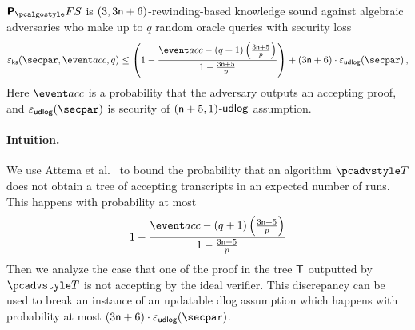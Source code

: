 \begin{lemma}
	\label{lem:plonkprot_ss}
	$\plonkprotfs$ is $(3, 3 \mathsf{n} + 6)$-rewinding-based knowledge sound against algebraic adversaries who make up to $q$ random oracle queries with security loss 
	\[
	\epscss(\secpar,\accProb, q) \leq \left(1 - \frac{\accProb - (q + 1) \left(\frac{3 \noofc + 5}{p} \right)}{1 - \frac{3 \noofc + 5}{p}}\right) + (3 \noofc + 6) \cdot \epsudlog (\secpar) %
	\,,
	\]
	Here $\accProb$ is a probability that the adversary outputs an accepting proof, 
	and $\epsudlog(\secpar)$ is security of $(\mathsf{n} + 5, 1)$-$\mathsf{udlog}$ 
	assumption.
\end{lemma}

\paragraph{Intuition.} We use Attema et al.~\cite[Proposition 2]{EPRINT:AttFehKlo21} to bound the probability that an algorithm $\tdv$ does not obtain a tree of accepting transcripts in an expected number of runs. This happens with probability at most
	\[
	1 - \frac{\accProb - (q + 1) \left(\frac{3 \noofc + 5}{p} \right)}{1 - \frac{3 \noofc + 5}{p}}
	\]
Then we analyze the case that one of the proof in the tree $\mathsf{T}$ outputted by $\tdv$ is not accepting by the ideal verifier. This discrepancy can be used to break an instance of an updatable dlog assumption which happens with probability at most $(3 \noofc + 6)  \cdot \epsudlog (\secpar)$. %

